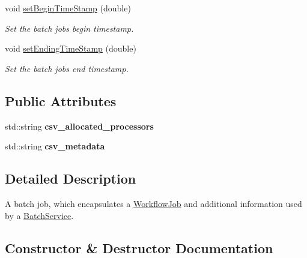 \begin{DoxyCompactItemize}
$$void \hyperlink{classwrench_1_1_batch_job_a9ce2b80c81f2f63da8555884a8fd5614}{set\+Begin\+Time\+Stamp} (double)
\begin{DoxyCompactList}\small\item\em Set the batch job\textquotesingle{}s begin timestamp. \end{DoxyCompactList}\item 
void \hyperlink{classwrench_1_1_batch_job_a66ad3c01839582a91cdd636f989d2c80}{set\+Ending\+Time\+Stamp} (double)
\begin{DoxyCompactList}\small\item\em Set the batch job\textquotesingle{}s end timestamp. \end{DoxyCompactList}\end{DoxyCompactItemize}
\subsection*{Public Attributes}
\begin{DoxyCompactItemize}
\item 
\mbox{\label{classwrench_1_1_batch_job_ad585cfa131dd16dae43509c0afad4db6}} 
std\+::string {\bfseries csv\+\_\+allocated\+\_\+processors}
\item 
\mbox{\label{classwrench_1_1_batch_job_a3b1994a6233be477d05d23115cdfd580}} 
std\+::string {\bfseries csv\+\_\+metadata}
\end{DoxyCompactItemize}


\subsection{Detailed Description}
A batch job, which encapsulates a \hyperlink{classwrench_1_1_workflow_job}{Workflow\+Job} and additional information used by a \hyperlink{classwrench_1_1_batch_service}{Batch\+Service}. 

\subsection{Constructor \& Destructor Documentation}
\mbox{\label{classwrench_1_1_batch_job_ae95376b89b37aa8e1c6c91fecb6082c8}} 
